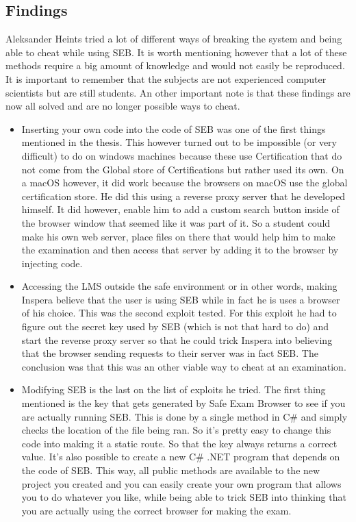\subsection{Findings}
Aleksander Heints tried a lot of different ways of breaking the system and being able to cheat while using SEB. It is worth mentioning however that a lot of these methods require a big amount of knowledge and would not easily be reproduced. It is important to remember that the subjects are not experienced computer scientists but are still students. An other important note is that these findings are now all solved and are no longer possible ways to cheat.\\

\begin{itemize}
\item Inserting your own code into the code of SEB was one of the first things mentioned in the thesis. This however turned out to be impossible (or very difficult) to do on windows machines because these use Certification that do not come from the Global store of Certifications  but rather used its own. On a macOS however, it did work because the browsers on macOS use the global certification store. He did this using a reverse proxy server that he developed himself. It did however, enable him to add a custom search button inside of the browser window that seemed like it was part of it. So a student could make his own web server, place files on there that would help him to make the examination and then access that server by adding it to the browser by injecting code.
\item Accessing the LMS outside the safe environment or in other words, making Inspera believe that the user is using SEB while in fact he is uses a browser of his choice. This was the second exploit tested. For this exploit he had to figure out the secret key used by SEB (which is not that hard to do) and start the reverse proxy server so that he could trick Inspera into believing that the browser sending requests to their server was in fact SEB. The conclusion was that this was an other viable way to cheat at an examination.
\item Modifying SEB is the last on the list of exploits he tried. The first thing mentioned is the key that gets generated by Safe Exam Browser to see if you are actually running SEB. This is done by a single method in C\# and simply checks the location of the file being ran. So it's pretty easy to change this code into making it a static route. So that the key always returns a correct value. It's also possible to create a new C\# .NET program that depends on the code of SEB. This way, all public methods are available to the new project you created and you can easily create your own program that allows you to do whatever you like, while being able to trick SEB into thinking that you are actually using the correct browser for making the exam.
\end{itemize}


